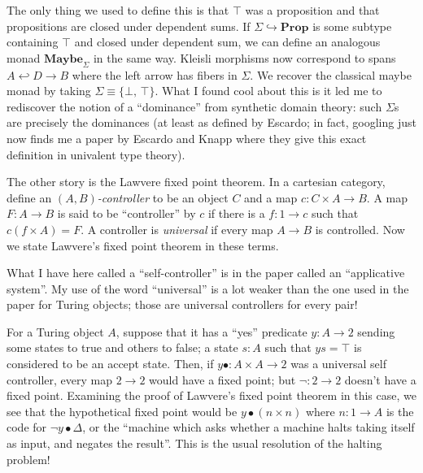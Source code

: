 \documentclass{amsart}
\begin{document}
The only thing we used to define this is that $\top$ was a proposition and that propositions are closed under dependent sums. If $\Sigma \hookrightarrow \textbf{Prop}$ is some subtype containing $\top$ and closed under dependent sum, we can define an analogous monad $\textbf{Maybe}_{\Sigma}$ in the same way. Kleisli morphisms now correspond to spans $A \hookleftarrow D \to B$ where the left arrow has fibers in $\Sigma$. We recover the classical maybe monad by taking $\Sigma \equiv \{\bot,\, \top\}$. What I found cool about this is it led me to rediscover the notion of a ``dominance'' from synthetic domain theory: such $\Sigma$s are precisely the dominances (at least as defined by Escardo; in fact, googling just now finds me a paper by Escardo and Knapp where they give this exact definition in univalent type theory).

The other story is the Lawvere fixed point theorem. In a cartesian category, define an $(A, B)$\emph{-controller} to be an object $C$ and a map $c : C \times A \to B$. A map $F : A \to B$ is said to be ``controller'' by $c$ if there is a $f : 1 \to c$ such that $c(f \times A) = F$. A controller is \emph{universal} if every map $A \to B$ is controlled. Now we state Lawvere's fixed point theorem in these terms.


What I have here called a ``self-controller'' is in the paper called an ``applicative system''. My use of the word ``universal'' is a lot weaker than the one used in the paper for Turing objects; those are universal controllers for every pair!

For a Turing object $A$, suppose that it has a ``yes'' predicate $y : A \to 2$ sending some states to true and others to false; a state $s : A$ such that $ys = \top$ is considered to be an accept state. Then, if $y\bullet : A \times A \to 2$ was a universal self controller, every map $2 \to 2$ would have a fixed point; but $\neg : 2 \to 2$ doesn't have a fixed point. Examining the proof of Lawvere's fixed point theorem in this case, we see that the hypothetical fixed point would be $y\bullet(n \times n)$ where $n : 1 \to A$ is the code for $\neg y\bullet \Delta$, or the ``machine which asks whether a machine halts taking itself as input, and negates the result''. This is the usual resolution of the halting problem!
\end{document}
